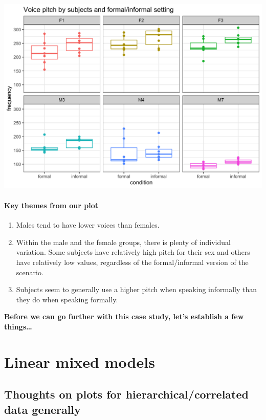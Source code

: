 \documentclass[
  openany]{book}
\providecommand{\tightlist}{%
  \setlength{\itemsep}{0pt}\setlength{\parskip}{0pt}}
\begin{document}
\includegraphics[width=1\linewidth]{images/m3/explore}

\hypertarget{key-themes-from-our-plot}{%
\paragraph{Key themes from our plot}\label{key-themes-from-our-plot}}

\begin{enumerate}
\def\labelenumi{\arabic{enumi}.}
\tightlist
\item
  Males tend to have lower voices than females.
\item
  Within the male and the female groups, there is plenty of individual variation. Some subjects have relatively high pitch for their sex and others have relatively low values, regardless of the formal/informal version of the scenario.
\item
  Subjects seem to generally use a higher pitch when speaking informally than they do when speaking formally.
\end{enumerate}

\textbf{Before we can go further with this case study, let's establish a few things\ldots{}}

\hypertarget{linear-mixed-models}{%
\section{Linear mixed models}\label{linear-mixed-models}}

\hypertarget{thoughts-on-plots-for-hierarchicalcorrelated-data-generally}{%
\subsection{Thoughts on plots for hierarchical/correlated data generally}\label{thoughts-on-plots-for-hierarchicalcorrelated-data-generally}}
\end{document}
